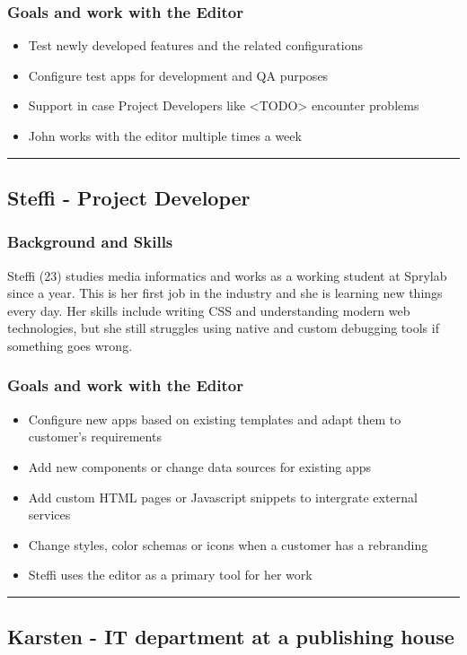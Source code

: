 \subsubsection{Goals and work with the Editor}
\begin{itemize}
  \item Test newly developed features and the related configurations
  \item Configure test apps for development and QA purposes
  \item Support in case Project Developers like <TODO> encounter problems
  \item John works with the editor multiple times a week
\end{itemize}

\hrule
\subsection{Steffi - Project Developer}
\subsubsection{Background and Skills}
Steffi (23) studies media informatics and works as a working student at Sprylab since a year. This is her first job in the industry and she is learning new things every day. Her skills include writing CSS and understanding modern web technologies, but she still struggles using native and custom debugging tools if something goes wrong.  
\\
\subsubsection{Goals and work with the Editor}
\begin{itemize}
  \item Configure new apps based on existing templates and adapt them to customer's requirements
  \item Add new components or change data sources for existing apps
  \item Add custom HTML pages or Javascript snippets to intergrate external services
  \item Change styles, color schemas or icons when a customer has a rebranding
  \item Steffi uses the editor as a primary tool for her work
\end{itemize}

\hrule
\subsection{Karsten - IT department at a publishing house}
